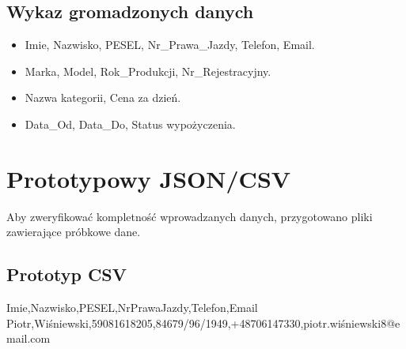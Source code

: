 \documentclass[a4paper,11pt,english,openany,oneside]{sphinxmanual}
\begin{document}
\subsection{Wykaz gromadzonych danych}
\label{\detokenize{rozdzial_3/index:wykaz-gromadzonych-danych}}\begin{itemize}
\item {} 
\sphinxAtStartPar
{} Imie, Nazwisko, PESEL, Nr\_Prawa\_Jazdy, Telefon, Email.

\item {} 
\sphinxAtStartPar
{} Marka, Model, Rok\_Produkcji, Nr\_Rejestracyjny.

\item {} 
\sphinxAtStartPar
{} Nazwa kategorii, Cena za dzień.

\item {} 
\sphinxAtStartPar
{} Data\_Od, Data\_Do, Status wypożyczenia.

\end{itemize}


\section{Prototypowy JSON/CSV}
\label{\detokenize{rozdzial_3/index:prototypowy-json-csv}}
\sphinxAtStartPar
Aby zweryfikować kompletność wprowadzanych danych, przygotowano pliki zawierające próbkowe dane.


\subsection{Prototyp CSV}
\label{\detokenize{rozdzial_3/index:prototyp-csv}}
\begin{sphinxVerbatim}[commandchars=\\\{\}]
Imie,Nazwisko,PESEL,Nr\PYGZus{}Prawa\PYGZus{}Jazdy,Telefon,Email
Piotr,Wiśniewski,59081618205,84679/96/1949,+48706147330,piotr.wiśniewski8@email.com
\end{sphinxVerbatim}
\end{document}
